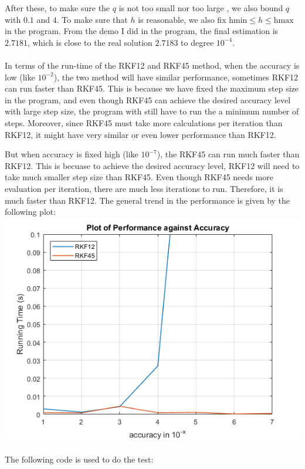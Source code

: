 \documentclass[11pt]{article}
\begin{document}
After these, to make sure the $ q $ is not too small nor too large , we also bound $ q $ with $ 0.1 $ and $ 4 $. To make sure that $ h $ is reasonable, we also fix $\text{hmin} \le  h \le \text{hmax} $ in the program. From the demo I did in the program, the final estimation is $ 2.7181 $, which is close to the real solution $ 2.7183 $ to degree $ 10^{-4} $.\\\\

In terms of the run-time of the RKF12 and RKF45 method, when the accuracy is low (like $ 10^{-2} $), the two method will have similar performance, sometimes RKF12 can run faster than RKF45. This is because we have fixed the maximum step size in the program, and even though RKF45 can achieve the desired accuracy level with large step size, the program with still have to run the a minimum number of steps. Moreover, since RKF45 must take more calculations per iteration than RKF12, it might have very similar or even lower performance than RKF12.

But when accuracy is fixed high (like $ 10^{-7} $), the RKF45 can run much faster than RKF12. This is becuase to achieve the desired accuracy level, RKF12 will need to take much smaller step size than RKF45. Even though RKF45 needs more evaluation per iteration, there are much less iterations to run. Therefore, it is much faster than RKF12. The general trend in the performance is given by the following plot:\\
\includegraphics{performance.png}\\\\
The following code is used to do the test:\\

\end{document}
